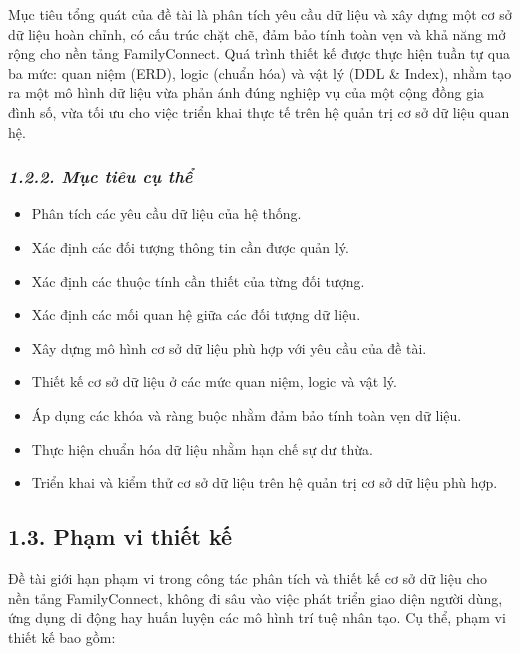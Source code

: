 Mục tiêu tổng quát của đề tài là phân tích yêu cầu dữ liệu và xây dựng một cơ sở dữ liệu hoàn chỉnh, có cấu trúc chặt chẽ, đảm bảo tính toàn vẹn và khả năng mở rộng cho nền tảng FamilyConnect. Quá trình thiết kế được thực hiện tuần tự qua ba mức: quan niệm (ERD), logic (chuẩn hóa) và vật lý (DDL \& Index), nhằm tạo ra một mô hình dữ liệu vừa phản ánh đúng nghiệp vụ của một cộng đồng gia đình số, vừa tối ưu cho việc triển khai thực tế trên hệ quản trị cơ sở dữ liệu quan hệ.

\hypertarget{mux1ee5c-tiuxeau-cux1ee5-thux1ec3}{%
\subsubsection{\texorpdfstring{\emph{\textbf{1.2.2. Mục tiêu cụ thể}}}{1.2.2. Mục tiêu cụ thể}}\label{mux1ee5c-tiuxeau-cux1ee5-thux1ec3}}

\begin{itemize}
\item
  Phân tích các yêu cầu dữ liệu của hệ thống.
\item
  Xác định các đối tượng thông tin cần được quản lý.
\item
  Xác định các thuộc tính cần thiết của từng đối tượng.
\item
  Xác định các mối quan hệ giữa các đối tượng dữ liệu.
\item
  Xây dựng mô hình cơ sở dữ liệu phù hợp với yêu cầu của đề tài.
\item
  Thiết kế cơ sở dữ liệu ở các mức quan niệm, logic và vật lý.
\item
  Áp dụng các khóa và ràng buộc nhằm đảm bảo tính toàn vẹn dữ liệu.
\item
  Thực hiện chuẩn hóa dữ liệu nhằm hạn chế sự dư thừa.
\item
  Triển khai và kiểm thử cơ sở dữ liệu trên hệ quản trị cơ sở dữ liệu phù hợp.
\end{itemize}

\hypertarget{phux1ea1m-vi-thiux1ebft-kux1ebf}{%
\subsection{\texorpdfstring{\textbf{1.3. Phạm vi thiết kế}}{1.3. Phạm vi thiết kế}}\label{phux1ea1m-vi-thiux1ebft-kux1ebf}}

Đề tài giới hạn phạm vi trong công tác phân tích và thiết kế cơ sở dữ liệu cho nền tảng FamilyConnect, không đi sâu vào việc phát triển giao diện người dùng, ứng dụng di động hay huấn luyện các mô hình trí tuệ nhân tạo. Cụ thể, phạm vi thiết kế bao gồm:

